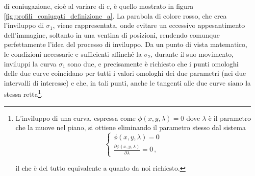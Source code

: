di coniugazione, cio\`e al variare di $c$,  \`e quello mostrato in figura
\ref{fig:profili_coniugati_definizione_a}. La parabola di colore
rosso, che crea l'inviluppo di $\sigma_1$, viene rappresentata,
onde evitare un eccessivo
appesantimento dell'immagine, soltanto in una ventina di posizioni,
rendendo comunque perfettamente l'idea del processo di inviluppo.
Da un punto di vista matematico, le condizioni necessarie e sufficienti
affinch\'e la $\sigma_2$, durante il suo movimento, inviluppi la curva
$\sigma_1$ sono due, e precisamente \`e richiesto che i punti omologhi
delle due curve coincidano per tutti i valori omologhi dei due parametri (nei
due intervalli di interesse) e che, in tali punti, anche le tangenti
alle due curve siano la stessa retta\footnote
{
L'inviluppo di una curva, espressa
come $\phi(x,y,\lambda)=0$ dove $\lambda$ \`e il parametro che la muove nel
piano, si ottiene eliminando il parametro stesso
dal sistema
\begin{equation}
\begin{cases}
\phi(x,y,\lambda)=0 \\
\displaystyle \frac{\partial \phi(x,y,\lambda)} {\partial\lambda}=0\,,
\end{cases}
\nonumber
\end{equation}

\noindent il che \`e del tutto equivalente a quanto da noi richiesto.
}.

